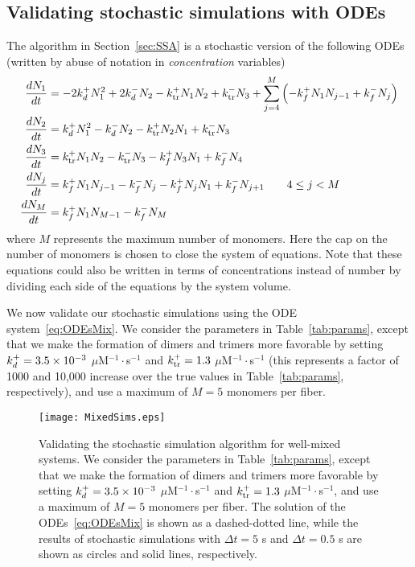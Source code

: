 \documentclass[11pt]{article}
\begin{document}
\begin{appendices}
\subsection{Validating stochastic simulations with ODEs \label{sec:validationFibs}}
The algorithm in Section\ \ref{sec:SSA} is a stochastic version of the following ODEs  \cite{edelstein1998models} (written by abuse of notation in \emph{concentration} variables)
\begin{subequations}
\label{eq:ODEsMix}
\begin{align}
\frac{d N_1}{dt} &= -2 k_d^+ N_1^2 + 2 k_d^- N_2 - k_\text{tr}^+ N_1 N_2 + k_\text{tr}^- N_3 + \sum_{j=4}^M \left(- k_f^+ N_1 N_{j-1}+k_f^- N_j\right)\\
\frac{d N_2}{dt} &= k_d^+ N_1^2 - k_d^- N_2 -k_\text{tr}^+ N_2 N_1 + k_\text{tr}^- N_3 \\
\frac{d N_3}{dt} &= k_\text{tr}^+ N_1 N_2 - k_\text{tr}^- N_3 - k_f^+ N_3 N_1 + k_f^- N_4 \\
\frac{d N_j}{dt} & = k_f^+ N_1 N_{j-1} - k_f^- N_j - k_f^+ N_j N_1 + k_f^- N_{j+1} \qquad 4 \leq j < M \\
\frac{d N_M}{dt} & = k_f^+ N_1 N_{M-1} - k_f^- N_M
\end{align}
\end{subequations}
where $M$ represents the maximum number of monomers. Here the cap on the number of monomers is chosen to close the system of equations. Note that these equations could also be written in terms of concentrations instead of number by dividing each side of the equations by the system volume. 

We now validate our stochastic simulations using the ODE system\ \eqref{eq:ODEsMix}. We consider the parameters in Table\ \ref{tab:params}, except that we make the formation of dimers and trimers more favorable by setting $k_d^+ = 3.5 \times 10^{-3}$ $\mu$M$^{-1}\cdot$s$^{-1}$ and $k_\text{tr}^+ = 1.3$ $\mu$M$^{-1}\cdot$s$^{-1}$ (this represents a factor of 1000 and 10,000 increase over the true values in Table\ \ref{tab:params}, respectively), and use a maximum of $M=5$ monomers per fiber. 

\begin{figure}
\centering
\texttt{[image: MixedSims.eps]}
\caption{\label{fig:MixedSims}Validating the stochastic simulation algorithm for well-mixed systems. We consider the parameters in Table\ \ref{tab:params}, except that we make the formation of dimers and trimers more favorable by setting $k_d^+ = 3.5 \times 10^{-3}$ $\mu$M$^{-1}\cdot$s$^{-1}$ and $k_\text{tr}^+ = 1.3$ $\mu$M$^{-1}\cdot$s$^{-1}$, and use a maximum of $M=5$ monomers per fiber. The solution of the ODEs\ \eqref{eq:ODEsMix} is shown as a dashed-dotted line, while the results of stochastic simulations with $\Delta t = 5$ s and $\Delta t = 0.5$ s are shown as circles and solid lines, respectively.  }
\end{figure}


\end{appendices}
\end{document}
